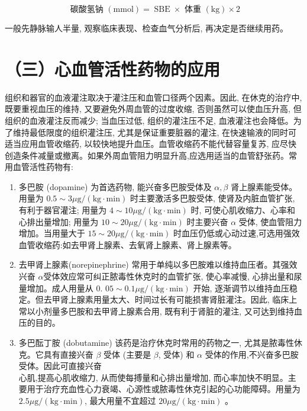 \documentclass[10pt]{article}
\begin{document}
\[
\text { 碳酸氢钠 }(\mathrm{mmol})=\operatorname{SBE} \times \text { 体重 }(\mathrm{kg}) \times 2
\]

一般先静脉输人半量, 观察临床表现、检查血气分析后, 再决定是否继续用药。

\section*{（三）心血管活性药物的应用}
组织和器官的血液灌注取决于灌注压和血管口径两个因素。因此, 在休克的治疗中, 既要重视血压的维持, 又要避免外周血管的过度收缩, 否则虽然可以使血压升高, 但组织的血液灌注反而减少; 当血压过低, 组织的灌注压不足, 血液灌注也会降低。为了维持最低限度的组织灌注压, 尤其是保证重要脏器的灌注, 在快速输液的同时可适当应用血管收缩药, 以较快地提升血压。血管收缩药不能代替容量复苏, 应尽快创造条件减量或撤离。如果外周血管阻力明显升高,应选用适当的血管舒张药。常用血管活性药物有:

\begin{enumerate}
  \item 多巴胺 (dopamine) 为首选药物, 能兴奋多巴胺受体及 $\alpha, \beta$ 肾上腺素能受体。用量为 $0.5 \sim 3 \mu \mathrm{g} /(\mathrm{kg} \cdot \mathrm{min})$ 时主要激活多巴胺受体, 使肾及内脏血管扩张, 有利于器官灌注; 用量为 $4 \sim 10 \mu \mathrm{g} /(\mathrm{kg} \cdot \mathrm{min})$ 时, 可使心肌收缩力、心率和心排出量增加; 用量为 $10 \sim 20 \mu \mathrm{g} /(\mathrm{kg} \cdot \mathrm{min})$ 时主要兴奋 $\alpha$ 受体, 使血管阻力增加。当用量大于 $15 \sim 20 \mu \mathrm{g} /(\mathrm{kg} \cdot \mathrm{min})$ 时血压仍低或心动过速,可选用强效血管收缩药:如去甲肾上腺素、去氧肾上腺素、肾上腺素等。

  \item 去甲肾上腺素(norepinephrine) 常用于单纯以多巴胺难以维持血压者。其强效兴奋 $\alpha$受体效应常可纠正脓毒性休克时的血管扩张, 使心率减慢, 心排出量和尿量增加。成人用量从 0. $05 \sim 0.1 \mu \mathrm{g} /(\mathrm{kg} \cdot \mathrm{min})$ 开始, 逐渐调节以维持血压稳定。但去甲肾上腺素用量太大、时间过长有可能损害肾脏灌注。因此, 临床上常以小剂量多巴胺和去甲肾上腺素合用, 既有利于肾脏的灌注, 又可达到维持血压的目的。

  \item 多巴酝丁胺 (dobutamine) 该药是治疗休克时常用的药物之一, 尤其是脓毒性休克。它具有直接兴奋 $\beta$ 受体 (主要是 $\beta$, 受体) 和 $\alpha$ 受体的作用,不兴奋多巴胺受体。因此可直接兴奋\\
心肌,提高心肌收缩力, 从而使每搏量和心排出量增加, 而心率加快不明显。主要用于治疗充血性心力衰竭、心源性或脓毒性休克引起的心功能障碍。用量为 $2.5 \mu \mathrm{g} /(\mathrm{kg} \cdot \mathrm{min})$, 最大用量不宜超过 $20 \mu \mathrm{g} /(\mathrm{kg} \cdot \mathrm{min})$ 。

\end{enumerate}
\end{document}
